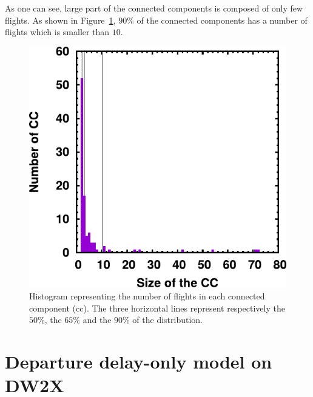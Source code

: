 \documentclass[twocolumn,9pt]{article}
\renewcommand{\figurename}{Figure}
\begin{document}
%
\noindent As one can see, large part of the connected components is composed of only few flights.
As shown in \figurename~\ref{fig:cc}, $90\%$ of the connected components has a number of flights which is
smaller than $10$.
%
\begin{figure}[h!]
\centering
\includegraphics[scale=0.8]{images/cc_hist_mindist030_mintime060.pdf}
\caption{\label{fig:cc}Histogram representing the number of flights in each connected component (cc). The
three horizontal lines represent respectively the $50\%$, the $65\%$ and the $90\%$ of the distribution.}
\end{figure}

\section*{Departure delay-only model on DW2X}
\end{document}

